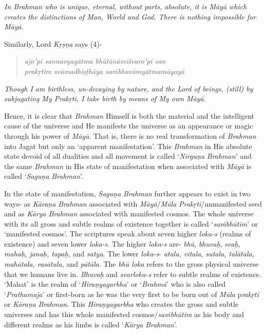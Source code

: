 \emph{In Brahman who is unique, eternal, without parts, absolute, it is Māyā which creates the distinctions of Man, World and God. There is nothing impossible for Māyā}.

Similarly, Lord \emph{Kṛṣṇa} says (4)-

\begin{verse}
\emph{ajo'pi sannavyayātma bhūtānāmīśvaro'pi san }\\
\emph{prakṛtim svāmadhiṣṭhāya saṁbhavāmyātmamāyayā }
\end{verse}

\emph{Though I am birthless, un-decaying by nature, and the Lord of beings, (still) by subjugating My Prakṛti, I take birth by means of My own Māyā.}

Hence, it is clear that \emph{Brahman} Himself is both the material and the intelligent cause of the universe and He manifests the universe as an appearance or magic through his power of \emph{Māyā}. That is, there is no real transformation of \emph{Brahman} into Jagat but only an `apparent manifestation'. This \emph{Brahman} in His absolute state devoid of all dualities and all movement is called `\emph{Nirguṇa} \emph{Brahman}' and the same \emph{Brahman} in His state of manifestation when associated with \emph{Māyā} is called `\emph{Saguṇa} \emph{Brahman}'.

In the state of manifestation, \emph{Saguṇa} \emph{Brahman} further appears to exist in two ways- as \emph{Kāraṇa} \emph{Brahman} associated with \emph{Māyā}/\emph{Mūla} \emph{Prakṛti}/unmanifested seed and as \emph{Kārya Brahman} associated with manifested cosmos. The whole universe with its all gross and subtle realms of existence together is called `\emph{saṁbhūtim}' or `manifested cosmos'. The scriptures speak about seven higher \emph{loka-s} (realms of existence) and seven lower \emph{loka-s}. The higher \emph{loka-s} are- \emph{bhū}, \emph{bhuvaḥ}, \emph{svaḥ}, \emph{mahaḥ, janaḥ, tapaḥ,} and \emph{satya}. The lower \emph{loka-s}- \emph{atala, vitala, sutala, talātala, mahātala, rasātala,} and \emph{pātāla}. The \emph{bhū loka} refers to the gross physical universe that we humans live in. \emph{Bhuvaḥ} and \emph{svarloka-s} refer to subtle realms of existence. `Mahat' is the realm of `\emph{Hiraṇyagarbha}' or `\emph{Brahmā}' who is also called `\emph{Prathamaja}' or first-born as he was the very first to be born out of \emph{Mūla} p\emph{rakṛti} or \emph{Kāraṇa} \emph{Brahman}. This \emph{Hiraṇyagarbha} who creates the gross and subtle universes and has this whole manifested cosmos/\emph{saṁbhūtim} as his body and different realms as his limbs is called `\emph{Kārya} \emph{Brahman}'.

